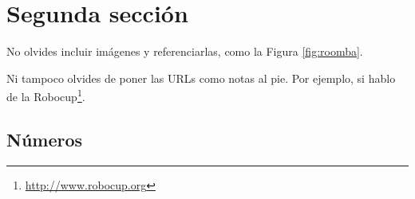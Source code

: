 %



\section{Segunda sección}
\label{sec:segundaseccion}

No olvides incluir imágenes y referenciarlas, como la Figura \ref{fig:roomba}.


Ni tampoco olvides de poner las URLs como notas al pie. Por ejemplo, si hablo de la Robocup\footnote{\url{http://www.robocup.org}}.

\subsection{Números}
\label{sec:subseccion}

